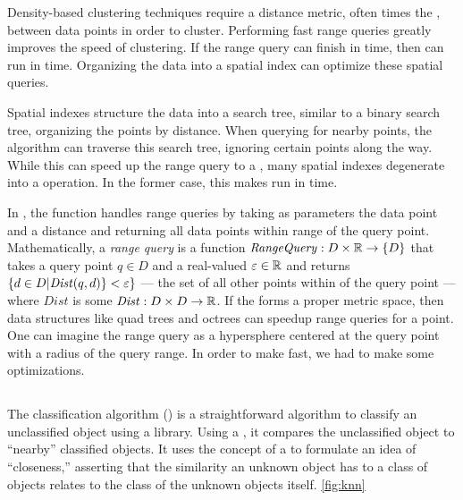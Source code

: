 Density-based clustering techniques require a distance metric, often times the \euclid{}, between data points in order to cluster.
Performing fast range queries greatly improves the speed of clustering.
If the range query can finish in  time, then \dbscan{} can run in  time.
Organizing the data into a spatial index can optimize these spatial queries.

Spatial indexes structure the data into a search tree, similar to a binary search tree, organizing the points by distance.
When querying for nearby points, the algorithm can traverse this search tree, ignoring certain points along the way.
While this can speed up the range query to a , many spatial indexes degenerate into a  operation. In the former case, this makes \dbscan{} run in  time.

In \dbscan{}, the  function handles range quer\-ies by taking as parameters the data point and a distance and returning all data points within range of the query point.
Mathematically, a \textit{range query} is a function $\mathit{RangeQuery}: D\times \mathbb{R} \rightarrow \{D\}$ that takes a query point $q\in D$ and a real-valued $\varepsilon{}\in\mathbb{R}$ and returns $\{d\in D | \mathit{Dist}(q, d)\} < \varepsilon{}\}$ --- the set of all other points within \eps{} of the query point --- where $\mathit{Dist}$ is some \distmetric{} $\mathit{Dist}: D\times D \rightarrow \mathbb{R} $.
If the \distmetric{} forms a proper metric space, then data structures like quad trees and octrees can speedup \eps{} range queries for a point.
One can imagine the range query as a hypersphere centered at the query point with a radius of the query range.
In order to make  fast, we had to make some optimizations.


\subsection{\kNNlong{}}\label{sec:background:knn}
The \kNNlong{} classification algorithm (\kNN{}) is a straightforward algorithm to classify an unclassified object using a library. 
Using a \compfunc{}, it compares the unclassified object to ``nearby'' classified objects.
It uses the concept of a \compfunc{} to formulate an idea of ``closeness,'' asserting that the similarity an unknown object has to a class of objects relates to the class of the unknown objects itself.
\autoref{fig:knn}


